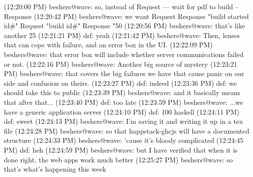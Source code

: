(12:20:00 PM) beshers@wave: so, instead of Request --- wait for pdf to build -- Response
(12:20:42 PM) beshers@wave: we want Request Response "build started id#"   Request "build id#"  Response "50%
(12:20:56 PM) beshers@wave: that's like another 25%
(12:21:21 PM) dsf: yeah
(12:21:42 PM) beshers@wave: Then, lenses that can cope with failure, and an error box in the UI.
(12:22:09 PM) beshers@wave: that error box will include whether server communications failed or not.
(12:22:16 PM) beshers@wave: Another big source of mystery
(12:23:21 PM) beshers@wave: that covers the big failures we have that cause panic on our side and confusion on theirs.
(12:23:27 PM) dsf: indeed
(12:23:36 PM) dsf: we should take this to public
(12:23:39 PM) beshers@wave: and it basically means that after that...
(12:23:40 PM) dsf: too late
(12:23:59 PM) beshers@wave: ...we have a generic application server
(12:24:10 PM) dsf: 100 haskell
(12:24:11 PM) dsf: sweet
(12:24:13 PM) beshers@wave: I'm saving it and writing it up in a tex file
(12:24:28 PM) beshers@wave: so that happstack-ghcjs will have a documented structure
(12:24:33 PM) beshers@wave: 'cause it's bloody complicated
(12:24:45 PM) dsf: heh
(12:24:59 PM) beshers@wave: but I have verified that when it is done right, the web apps work much better
(12:25:27 PM) beshers@wave: so that's what's happening this week



